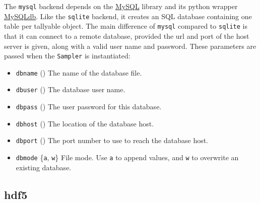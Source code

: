 The \texttt{mysql} backend depends on the \href{http://www.mysql.com/downloads/}{MySQL} library and its python wrapper
\href{http://sourceforge.net/projects/mysql-python}{MySQLdb}. Like the \texttt{sqlite} backend, it creates an SQL database containing
one table per tallyable object. The main difference of \texttt{mysql} compared to
\texttt{sqlite} is that it can connect to a remote database, provided the url and
port of the host server is given, along with a valid user name and password.
These parameters are passed when the \texttt{Sampler} is instantiated:
\begin{itemize}
\item {} 
\texttt{dbname} () The name of the database file.

\item {} 
\texttt{dbuser} () The database user name.

\item {} 
\texttt{dbpass} () The user password for this database.

\item {} 
\texttt{dbhost} () The location of the database host.

\item {} 
\texttt{dbport} ()    The port number to use to reach the database host.

\item {} 
\texttt{dbmode} {\{}\texttt{a}, \texttt{w}{\}} File mode.  Use \texttt{a} to append values, and \texttt{w}
to overwrite an existing database.

\end{itemize}
\begin{center}\begin{sffamily}
\end{sffamily}
\end{center}



\hypertarget{hdf5}{}
\subsection{hdf5}
\label{hdf5}


